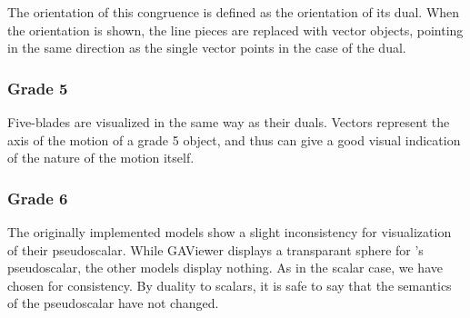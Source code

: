 The orientation of this congruence is defined as the orientation of its dual.  When the orientation is shown, the line pieces are replaced with vector objects, pointing in the same direction as the single vector points in the case of the dual.

\subsubsection{Grade 5}
Five-blades are visualized in the same way as their duals.  Vectors represent the axis of the motion of a grade 5 object, and thus can give a good visual indication of the nature of the motion itself.

\subsubsection{Grade 6}
The originally implemented models show a slight inconsistency for visualization of their pseudoscalar.  While GAViewer displays a transparant sphere for \ega{}'s pseudoscalar, the other models display nothing.  As in the scalar case, we have chosen for consistency.  By duality to scalars, it is safe to say that the semantics of the pseudoscalar have not changed.
